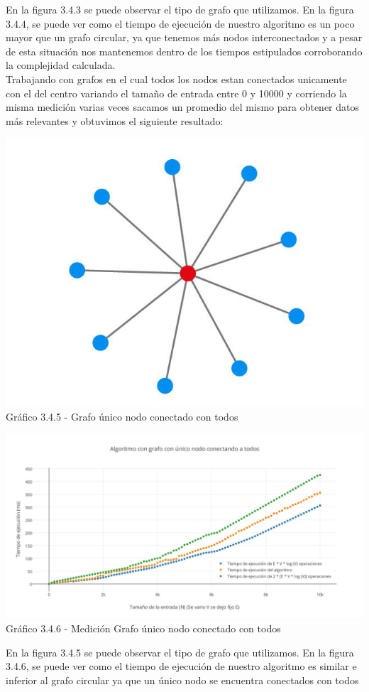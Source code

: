 En la figura 3.4.3 se puede observar el tipo de grafo que utilizamos. En la figura 3.4.4, se puede ver como el tiempo de ejecución de nuestro algoritmo es un poco mayor que un grafo circular, ya que tenemos más nodos interconectados y a pesar de esta situación nos mantenemos dentro de los tiempos estipulados corroborando la complejidad calculada.\\


Trabajando con grafos en el cual todos los nodos estan conectados unicamente con el del centro variando el tamaño de entrada entre 0 y 10000 y corriendo la misma medición varias veces sacamos un promedio del mismo para obtener datos  más relevantes y obtuvimos el siguiente resultado:

\vspace*{0.3cm} \vspace*{0.3cm}
  \begin{center}
 \includegraphics[scale=0.5]{./ej3/uniconodo.jpg}
 	{\\Gráfico 3.4.5 - Grafo único nodo conectado con todos}
  \end{center}
  \vspace*{0.3cm}
  
  \vspace*{0.3cm} \vspace*{0.3cm}
  \begin{center}
 \includegraphics[scale=0.28]{./ej3/uniconodo2.jpg}
 	{Gráfico 3.4.6 - Medición Grafo único nodo conectado con todos}
  \end{center}
  \vspace*{0.3cm}

En la figura 3.4.5 se puede observar el tipo de grafo que utilizamos. En la figura 3.4.6, se puede ver como el tiempo de ejecución de nuestro algoritmo es similar e inferior al grafo circular ya que un único nodo se encuentra conectados con todos\\

